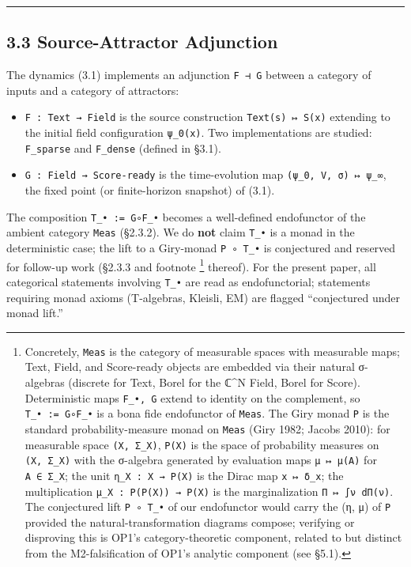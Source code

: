 \documentclass[
]{article}
\providecommand{\tightlist}{%
  \setlength{\itemsep}{0pt}\setlength{\parskip}{0pt}}
\begin{document}
\begin{center}\rule{0.5\linewidth}{0.5pt}\end{center}

\hypertarget{source-attractor-adjunction}{%
\subsection{3.3 Source-Attractor
Adjunction}\label{source-attractor-adjunction}}

The dynamics (3.1) implements an adjunction \texttt{F\ ⊣\ G} between a
category of inputs and a category of attractors:

\begin{itemize}
\tightlist
\item
  \texttt{F\ :\ Text\ →\ Field} is the source construction
  \texttt{Text(s)\ ↦\ S(x)} extending to the initial field configuration
  \texttt{ψ\_0(x)}. Two implementations are studied: \texttt{F\_sparse}
  and \texttt{F\_dense} (defined in §3.1).
\item
  \texttt{G\ :\ Field\ →\ Score-ready} is the time-evolution map
  \texttt{(ψ\_0,\ V,\ σ)\ ↦\ ψ\_∞}, the fixed point (or finite-horizon
  snapshot) of (3.1).
\end{itemize}

The composition \texttt{T\_•\ :=\ G∘F\_•} becomes a well-defined
endofunctor of the ambient category \texttt{Meas} (§2.3.2). We do
\textbf{not} claim \texttt{T\_•} is a monad in the deterministic case;
the lift to a Giry-monad \texttt{P\ ∘\ T\_•} is conjectured and reserved
for follow-up work (§2.3.3 and footnote \footnote{Concretely,
  \texttt{Meas} is the category of measurable spaces with measurable
  maps; Text, Field, and Score-ready objects are embedded via their
  natural σ-algebras (discrete for Text, Borel for the ℂ\^{}N Field,
  Borel for Score). Deterministic maps \texttt{F\_•,\ G} extend to
  identity on the complement, so \texttt{T\_•\ :=\ G∘F\_•} is a bona
  fide endofunctor of \texttt{Meas}. The Giry monad \texttt{P} is the
  standard probability-measure monad on \texttt{Meas} (Giry 1982; Jacobs
  2010): for measurable space \texttt{(X,\ Σ\_X)}, \texttt{P(X)} is the
  space of probability measures on \texttt{(X,\ Σ\_X)} with the
  σ-algebra generated by evaluation maps \texttt{μ\ ↦\ μ(A)} for
  \texttt{A\ ∈\ Σ\_X}; the unit \texttt{η\_X\ :\ X\ →\ P(X)} is the
  Dirac map \texttt{x\ ↦\ δ\_x}; the multiplication
  \texttt{μ\_X\ :\ P(P(X))\ →\ P(X)} is the marginalization
  \texttt{Π\ ↦\ ∫ν\ dΠ(ν)}. The conjectured lift \texttt{P\ ∘\ T\_•} of
  our endofunctor would carry the (η, μ) of \texttt{P} provided the
  natural-transformation diagrams compose; verifying or disproving this
  is OP1's category-theoretic component, related to but distinct from
  the M2-falsification of OP1's analytic component (see §5.1).}
thereof). For the present paper, all categorical statements involving
\texttt{T\_•} are read as endofunctorial; statements requiring monad
axioms (T-algebras, Kleisli, EM) are flagged ``conjectured under monad
lift.''
\end{document}
